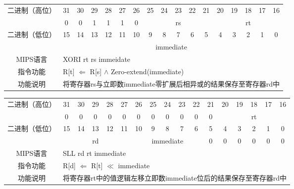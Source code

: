 \begin{table}
\begin{tabular}{|c|c|c|c|c|c|c|c|c|c|c|c|c|c|c|c|c|}
\hline
\multirow{2}{*}{二进制（高位）} &
31&30&29&28&27&26&25&24&23&22&21&20&19&18&17&16\\
\cline{2-17}
&
0&0&1&1&1&
0&
\multicolumn{5}{c|}{rs}&
\multicolumn{5}{c|}{rt}\\
\hline
\multirow{2}{*}{二进制（低位）} &
15&14&13&12&11&10&9&8&7&6&5&4&3&2&1&0\\
\cline{2-17}
&
\multicolumn{16}{c|}{immediate}\\
\hline
MIPS语言&
\multicolumn{16}{l|}{XORI rt rs immeidate}\\
\hline
指令功能&
\multicolumn{16}{l|}{R[t] $\Leftarrow$ R[s] $\land$ Zero-extend(immediate)}\\
\hline
功能说明&
\multicolumn{16}{l|}{将寄存器rs与立即数immediate零扩展后相异或的结果保存至寄存器rd中}\\
\hline
\end{tabular}
\end{table}

\begin{table}
\begin{tabular}{|c|c|c|c|c|c|c|c|c|c|c|c|c|c|c|c|c|}
\hline
\multirow{2}{*}{二进制（高位）} &
31&30&29&28&27&26&25&24&23&22&21&20&19&18&17&16\\
\cline{2-17}
&
0&0&0&0&0&
0&0&0&0&0&
0&
\multicolumn{5}{c|}{rt}\\
\hline
\multirow{2}{*}{二进制（低位）} &
15&14&13&12&11&10&9&8&7&6&5&4&3&2&1&0\\
\cline{2-17}
&
\multicolumn{5}{c|}{rd} &
\multicolumn{5}{c|}{immediate} &
0&0&0&0&0&
0\\
\hline
MIPS语言&
\multicolumn{16}{l|}{SLL rd rt immediate}\\
\hline
指令功能&
\multicolumn{16}{l|}{R[d] $\Leftarrow$ R[t] $\ll$ immediate}\\
\hline
功能说明&
\multicolumn{16}{l|}{将寄存器rt中的值逻辑左移立即数immediate位后的结果保存至寄存器rd中}\\
\hline
\end{tabular}
\end{table}

\clearpage


